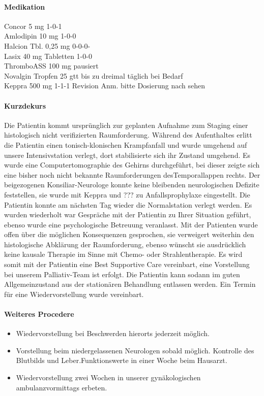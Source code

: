 \paragraph{Medikation} 
Concor
5 mg 1-0-1 \\
Amlodipin 10 mg 1-0-0 \\
Halcion Tbl. 0,25 mg 
0-0-0-\\ 
Lasix 40 mg Tabletten 1-0-0
\\
ThromboASS 100 mg pausiert 
\\
Novalgin Tropfen 25 gtt bis zu
dreimal täglich bei Bedarf 
\\
Keppra 500 mg 1-1-1 Revision Anm.
bitte Dosierung nach sehen

\paragraph{Kurzdekurs} Die Patientin kommt ursprünglich zur geplanten
Aufnahme zum Staging einer histologisch nicht
verifizierten Raumforderung. Während des Aufenthaltes
erlitt die Patientin einen tonisch-klonischen Krampfanfall und
wurde umgehend auf unsere Intensivstation verlegt, dort
stabilisierte sich ihr Zustand umgehend. Es wurde
eine Computertomographie des Gehirns durchgeführt, bei
dieser zeigte sich eine bisher noch nicht bekannte
Raumforderungen desTemporallappen rechts. Der
beigezogenen Konsiliar-Neurologe konnte keine bleibenden
neurologischen Defizite feststellen, sie wurde mit
Keppra und ??? zu Anfallsprophylaxe eingestellt. Die Patientin
konnte am nächsten Tag wieder die Normalstation verlegt
werden. Es wurden wiederholt war Gespräche mit der Patientin
zu Ihrer Situation geführt, ebenso wurde eine psychologische
Betreuung veranlasst. Mit der Patienten wurde offen über die
 möglichen Konsequenzen gesprochen,  sie
verweigert weiterhin den histologische Abklärung der
Raumforderung, ebenso wünscht sie ausdrücklich keine kausale Therapie im
Sinne mit Chemo- oder Strahlentherapie. Es wird somit mit der
Patientin eine Best Supportive Care vereinbart, eine
Vorstellung bei unserem Palliativ-Team ist erfolgt. Die
Patientin kann sodann im guten Allgemeinzustand aus der
stationären Behandlung entlassen werden. Ein Termin für eine
Wiedervorstellung wurde vereinbart. 

\paragraph{Weiteres Procedere} 
\begin{itemize}
  \item Wiedervorstellung bei Beschwerden hierorts jederzeit möglich.
  \item 
Vorstellung beim niedergelassenen Neurologen sobald möglich.
Kontrolle des Blutbilds und Leber.Funktionswerte in
einer Woche beim Hausarzt.
\item Wiedervorstellung zwei Wochen in unserer gynäkologischen
ambulanzvormittags erbeten.
\end{itemize}



